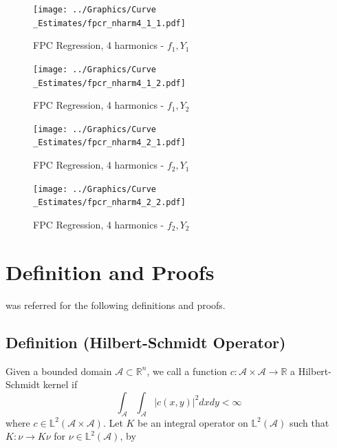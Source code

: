 \documentclass[11pt,twoside,a4paper]{article}
\begin{document}
	\begin{figure}[H]
		\centering
		\begin{minipage}{.5\textwidth}
			\centering
			\texttt{[image: ../Graphics/Curve\\\_Estimates/fpcr\_nharm4\_1\_1.pdf]}
			\caption{FPC Regression, 4 harmonics - $f_1, Y_1$}
		\end{minipage}%
		\begin{minipage}{.5\textwidth}
			\centering
			\texttt{[image: ../Graphics/Curve\\\_Estimates/fpcr\_nharm4\_1\_2.pdf]}
			\caption{FPC Regression, 4 harmonics - $f_1, Y_2$}
		\end{minipage}
	\end{figure}
	
	\begin{figure}[H]
		\centering
		\begin{minipage}{.5\textwidth}
			\centering
			\texttt{[image: ../Graphics/Curve\\\_Estimates/fpcr\_nharm4\_2\_1.pdf]}
			\caption{FPC Regression, 4 harmonics - $f_2, Y_1$}
		\end{minipage}%
		\begin{minipage}{.5\textwidth}
			\centering
			\texttt{[image: ../Graphics/Curve\\\_Estimates/fpcr\_nharm4\_2\_2.pdf]}
			\caption{FPC Regression, 4 harmonics - $f_2, Y_2$}
		\end{minipage}
	\end{figure}


\newpage


	\section{Definition and Proofs}
	\cite{alexanderian_KLexpansion_2015} was referred for the following definitions and proofs.
	
	\subsection{Definition (Hilbert-Schmidt Operator)}\label{def_HS}
	Given a bounded domain $\mathcal{A} \subset \mathbb{R}^n$, we call a function $c : \mathcal{A} \times \mathcal{A} \rightarrow \mathbb{R}$ a Hilbert-Schmidt kernel if
	\begin{equation}
		\int_{\mathcal{A}} \int_{\mathcal{A}} \vert c(x,y) \vert ^2 dx dy < \infty
	\end{equation}
	where $c \in \mathbb{L}^2(\mathcal{A} \times \mathcal{A})$. Let $K$ be an integral operator on $\mathbb{L}^2(\mathcal{A})$ such that $K : \nu \rightarrow K \nu$ for $\nu \in \mathbb{L}^2(\mathcal{A})$, by
	
\end{document}
